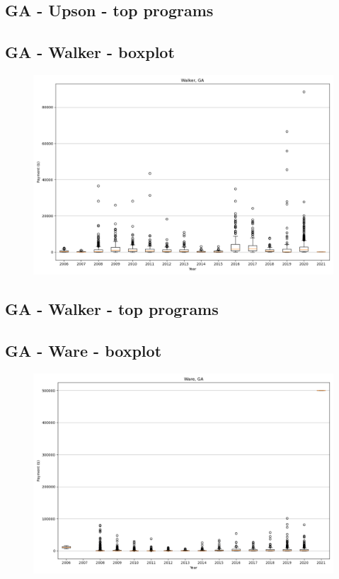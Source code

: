 \subsection*{GA - Upson - top programs}

\newpage
\subsection*{GA - Walker - boxplot}
\begin{figure}[h]
\centering
\includegraphics[width=7in]{../output/boxplots/counties/Walker-GA_boxplot.png}
\end{figure}


\subsection*{GA - Walker - top programs}

\newpage
\subsection*{GA - Ware - boxplot}
\begin{figure}[h]
\centering
\includegraphics[width=7in]{../output/boxplots/counties/Ware-GA_boxplot.png}
\end{figure}


